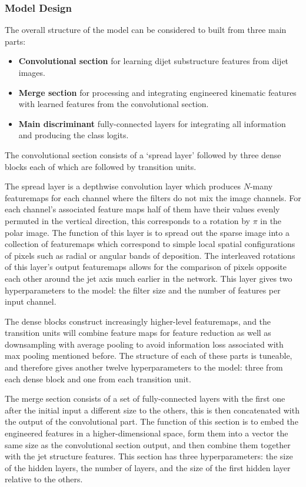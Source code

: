 \subsubsection{Model Design}
The overall structure of the model can be considered to built from three main parts:
\begin{itemize}[leftmargin=.5in,noitemsep]
    \item \textbf{Convolutional section} for learning dijet substructure features from dijet images.
    \item \textbf{Merge section} for processing and integrating engineered kinematic features with learned features from the convolutional section.
    \item \textbf{Main discriminant} fully-connected layers for integrating all information and producing the class logits.
\end{itemize}

The convolutional section consists of a `spread layer' followed by three dense blocks each of which are followed by transition units.

The spread layer is a depthwise convolution layer which produces $N$-many featuremaps for each channel where the filters do not mix the image channels. 
For each channel's associated feature maps half of them have their values evenly permuted in the vertical direction, this corresponds to a rotation by $\pi$ in the polar image.
The function of this layer is to spread out the sparse image into a collection of featuremaps which correspond to simple local spatial configurations of pixels such as radial or angular bands of deposition. 
The interleaved rotations of this layer's output featuremaps allows for the comparison of pixels opposite each other around the jet axis much earlier in the network.  
This layer gives two hyperparameters to the model: the filter size and the number of features per input channel.

The dense blocks construct increasingly higher-level featuremaps, and the transition units will combine feature maps for feature reduction as well as downsampling with average pooling to avoid information loss associated with max pooling mentioned before.  
The structure of each of these parts is tuneable, and therefore gives another twelve hyperparameters to the model: three from each dense block and one from each transition unit. 

The merge section consists of a set of fully-connected layers with the first one after the initial input a different size to the others, this is then concatenated with the output of the convolutional part.
The function of this section is to embed the engineered features in a higher-dimensional space, form them into a vector the same size as the convolutional section output, and then combine them together with the jet structure features. This section has three hyperparameters: the size of the hidden layers, the number of layers, and the size of the first hidden layer relative to the others. 


